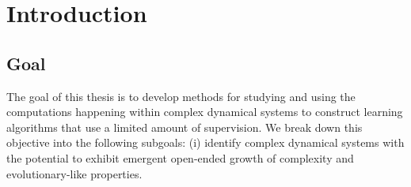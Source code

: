 \chapter{Introduction}


\section{Goal}

The goal of this thesis is to develop methods for studying and using the
computations happening within complex dynamical systems to construct learning algorithms that
use a limited amount of supervision. We break down this objective into the
following subgoals: (i) identify complex dynamical systems with the potential to
exhibit emergent open-ended growth of complexity and evolutionary-like
properties.
